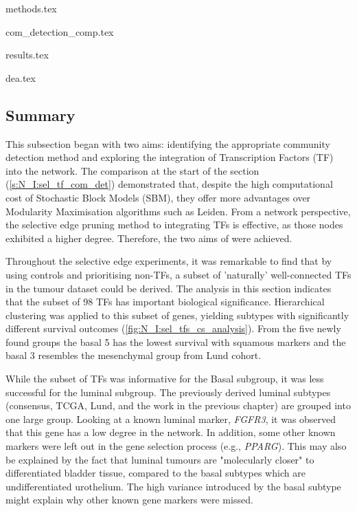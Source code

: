 {methods.tex}

{com_detection_comp.tex}

{results.tex}

{dea.tex}


\subsection{Summary}

This subsection began with two aims: identifying the appropriate community detection method and exploring the integration of Transcription Factors (TF) into the network. The comparison at the start of the section (\ref{s:N_I:sel_tf_com_det}) demonstrated that, despite the high computational cost of Stochastic Block Models (SBM), they offer more advantages over Modularity Maximisation algorithms such as Leiden. From a network perspective, the selective edge pruning method to integrating TFs is effective, as those nodes exhibited a higher degree. Therefore, the two aims of were achieved.

Throughout the selective edge experiments, it was remarkable to find that by using controls and prioritising non-TFs, a subset of 'naturally' well-connected TFs in the tumour dataset could be derived. The analysis in this section indicates that the subset of 98 TFs has important biological significance. Hierarchical clustering was applied to this subset of genes, yielding subtypes with significantly different survival outcomes (\cref{fig:N_I:sel_tfs_cs_analysis}).  From the five newly found groups the basal 5 has the lowest survival with squamous markers and the basal 3 resembles the mesenchymal group from Lund cohort.

While the subset of TFs was informative for the Basal subgroup, it was less successful for the luminal subgroup. The previously derived luminal subtypes (consensus, TCGA, Lund, and the work in the previous chapter) are grouped into one large group. Looking at a known luminal marker, \textit{FGFR3}, it was observed that this gene has a low degree in the network. In addition, some other known markers were left out in the gene selection process (e.g., \textit{PPARG}). This may also be explained by the fact that luminal tumours are "molecularly closer" to differentiated bladder tissue, compared to the basal subtypes which are undifferentiated urothelium. The high variance introduced by the basal subtype might explain why other known gene markers were missed.

